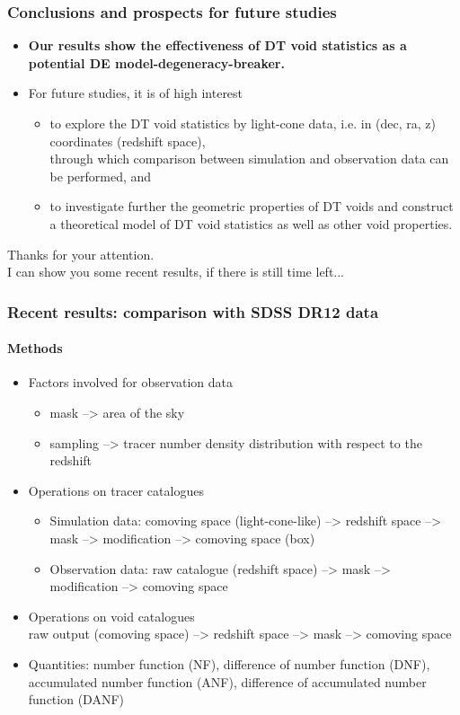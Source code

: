 \documentclass{beamer}
\newtheorem{Acknowledgements}{Acknowledgements}
\newtheorem{Narrow down the analysis}{Narrow down the analysis}
\begin{document}
\begin{frame}
	\frametitle{Conclusions and prospects for future studies}
	\begin{itemize}
	\pause \item \textbf{Our results show the effectiveness of DT void statistics as a potential DE model-degeneracy-breaker.}
	\pause \item For future studies, it is of high interest 
	\begin{itemize}
	\item to explore the DT void statistics by light-cone data, i.e. in (dec, ra, z) coordinates (redshift space), \\
	\pause through which comparison between simulation and observation data can be performed, \pause and
	\item to investigate further the geometric properties of DT voids and construct a theoretical model of DT void statistics as well as other void properties.
	\end{itemize}
	\end{itemize}
	\pause
	\centering
	\large{Thanks for your attention.\\}
	\pause
	I can show you some recent results, if there is still time left...
\end{frame}

\begin{frame}
	\frametitle{Recent results: comparison with SDSS DR12 data}
	\framesubtitle{Methods}
	\begin{itemize}
	\pause \item Factors involved for observation data
	\begin{itemize}
	 \pause \item mask --> area of the sky
	 \pause \item sampling --> tracer number density distribution with respect to the redshift
	\end{itemize}	
	\pause \item Operations on tracer catalogues
	\begin{itemize}
	\pause \item Simulation data: comoving space (light-cone-like) --> redshift space --> mask --> modification --> comoving space (box)
	\pause \item Observation data: raw catalogue (redshift space) --> mask --> modification --> comoving space
	\end{itemize}
	\pause \item Operations on void catalogues\\
	raw output (comoving space) --> redshift space --> mask --> comoving space
	\pause \item Quantities: number function (NF), difference of number function (DNF), accumulated number function (ANF), difference of accumulated number function (DANF)
	\end{itemize}
	
\end{frame}
\end{document}
